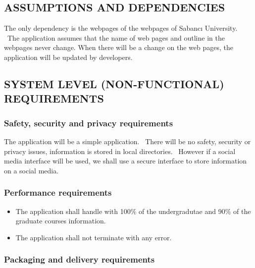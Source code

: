 \documentclass[twoside,letterpaper]{article}
\begin{document}
\subsection[ASSUMPTIONS AND
DEPENDENCIES]{\rmfamily\bfseries\color{black}
ASSUMPTIONS AND DEPENDENCIES}

{\color{black}
The only dependency is the webpages of the webpages of Sabanc\i{} University. \ The application assumes that the name of web pages and outline in the webpages never change. When there will be a change on the web pages, the application will be updated by developers.  
}

\subsection[SYSTEM LEVEL (NON{}-FUNCTIONAL)
REQUIREMENTS]{\rmfamily\bfseries\color{black}
SYSTEM LEVEL (NON-FUNCTIONAL) REQUIREMENTS}

\subsubsection[Safety, security and privacy
requirements]{\rmfamily\bfseries\color{black}
Safety, security and privacy requirements}

{\color{black}
The application will be a simple application. \ There will be no safety, security or privacy issues, information is stored in local directories. \ However if a social media interface will be used, we shall use a secure interface to store information on a social media. }

\subsubsection[Performance
requirements]{\rmfamily\bfseries\color{black}
Performance requirements}

\noindent\begin{itemize}
  \item The application shall handle with 100\% of the undergradutae and 90\% of the graduate courses information.
  \item The application shall not terminate with any error.
\end{itemize}

\subsubsection[Packaging and delivery
requirements]{\rmfamily\bfseries\color{black}
Packaging and delivery requirements}
\end{document}
